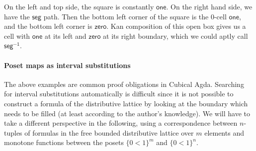 \documentclass[11pt]{article}
\theoremstyle{definition}
\newcommand{\cset}[1]{\ensuremath{\mathsf{{#1}}}}
\begin{document}
On the left and top side, the square is constantly \cset{one}. On the right hand
side, we have the \cset{seg} path. Then the bottom left corner of the square is
the 0-cell \cset{one}, and the bottom left corner is \cset{zero}.
Kan composition of this open box gives us a cell with \cset{one} at its
left and \cset{zero} at its right boundary, which we could aptly call \cset{seg^{-1}}.



\paragraph{Poset maps as interval substitutions}

The above examples are common proof obligations in Cubical Agda. Searching for
interval substitutions automatically is difficult since it is not possible to
construct a formula of the distributive lattice by looking at the boundary which
needs to be filled (at least according to the author's knowledge). We 
will have to take a different perspective in the following, using a
correspondence between $n$-tuples of formulas in the free bounded distributive
lattice over $m$ elements and monotone
functions between the posets  $\{ 0<1 \}^m$ and $\{ 0<1 \}^n$.

\end{document}
